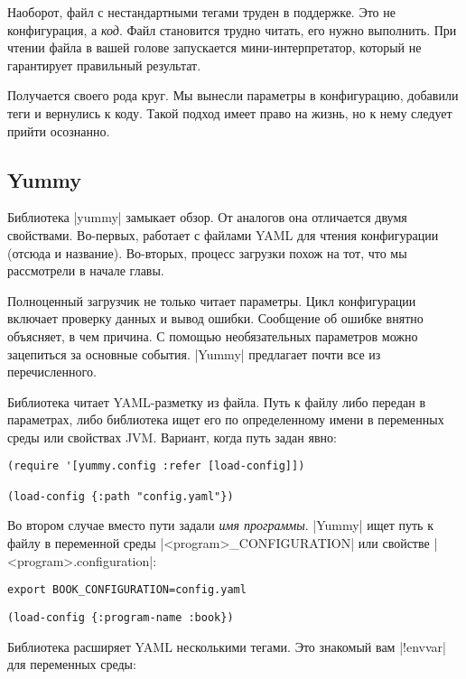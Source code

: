 Наоборот, файл с нестандартными тегами труден в поддержке. Это не конфигурация,
а \emph{код}. Файл становится трудно читать, его нужно выполнить. При чтении
файла в вашей голове запускается мини-интерпретатор, который не гарантирует
правильный результат.

Получается своего рода круг. Мы вынесли параметры в конфигурацию, добавили теги
и вернулись к коду. Такой подход имеет право на жизнь, но к нему следует прийти
осознанно.

\subsection{Yummy}

Библиотека \spverb|yummy| замыкает
обзор. От аналогов она отличается двумя свойствами. Во-первых, работает с
файлами YAML для чтения конфигурации (отсюда и название). Во-вторых, процесс
загрузки похож на тот, что мы рассмотрели в начале главы.

Полноценный загрузчик не только читает параметры. Цикл конфигурации включает
проверку данных и вывод ошибки. Сообщение об ошибке внятно объясняет, в чем
причина. С помощью необязательных параметров можно зацепиться за основные
события. \spverb|Yummy| предлагает почти все из перечисленного.

Библиотека читает YAML-разметку из файла. Путь к файлу либо передан в
параметрах, либо библиотека ищет его по определенному имени в переменных среды
или свойствах JVM. Вариант, когда путь задан явно:

\begin{verbatim}
(require '[yummy.config :refer [load-config]])

(load-config {:path "config.yaml"})
\end{verbatim}

Во втором случае вместо пути задали \emph{имя программы}. \spverb|Yummy| ищет
путь к файлу в переменной среды \spverb|<program>_CONFIGURATION| или свойстве
\spverb|<program>.configuration|:

\begin{verbatim}
export BOOK_CONFIGURATION=config.yaml
\end{verbatim}

\begin{verbatim}
(load-config {:program-name :book})
\end{verbatim}

Библиотека расширяет YAML несколькими тегами. Это знакомый вам \spverb|!envvar|
для переменных среды:

